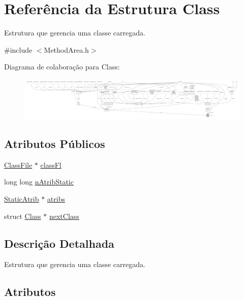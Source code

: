 \hypertarget{structClass}{}\section{Referência da Estrutura Class}
\label{structClass}


Estrutura que gerencia uma classe carregada.  




{\ttfamily \#include $<$Method\+Area.\+h$>$}



Diagrama de colaboração para Class\+:
\nopagebreak
\begin{figure}[H]
\begin{center}
\leavevmode
\includegraphics[width=350pt]{structClass__coll__graph}
\end{center}
\end{figure}
\subsection*{Atributos Públicos}
\begin{DoxyCompactItemize}
\item 
\hyperlink{structClassFile}{Class\+File} $\ast$ \hyperlink{structClass_a13dbcdd95b80b2c8fbd266a656ca927a}{class\+Fl}
\item 
long long \hyperlink{structClass_a8af3ca1a9103400ec8118948464edad0}{n\+Atrib\+Static}
\item 
\hyperlink{structStaticAtrib}{Static\+Atrib} $\ast$ \hyperlink{structClass_a6cf0307cc3e514a4e8c6afb54f050da8}{atribs}
\item 
struct \hyperlink{structClass}{Class} $\ast$ \hyperlink{structClass_a79ceca419d487e69bc791a3c2e1a96f2}{next\+Class}
\end{DoxyCompactItemize}


\subsection{Descrição Detalhada}
Estrutura que gerencia uma classe carregada. 

\subsection{Atributos}
\mbox{\label{structClass_a6cf0307cc3e514a4e8c6afb54f050da8}} 
